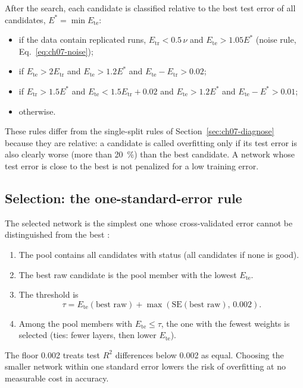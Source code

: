 After the search, each candidate is classified relative to the best test error of all candidates,
$E^* = \min E_\text{te}$:
\begin{itemize}
  \item {} if the data contain replicated runs, $E_\text{tr} < 0.5\,\nu$ and $E_\text{te} > 1.05
    E^*$ (noise rule, Eq.~\eqref{eq:ch07-noise});
  \item {} if $E_\text{te} > 2E_\text{tr}$ and $E_\text{te} > 1.2E^*$ and $E_\text{te} -
    E_\text{tr} > 0.02$;
  \item {} if $E_\text{tr} > 1.5E^*$ and $E_\text{te} < 1.5E_\text{tr} + 0.02$ and $E_\text{te} >
    1.2E^*$ and $E_\text{te} - E^* > 0.01$;
  \item {} otherwise.
\end{itemize}
These rules differ from the single-split rules of Section~\ref{sec:ch07-diagnose} because they are relative: a
candidate is called overfitting only if its test error is also clearly worse (more than 20~\%) than the best
candidate. A network whose test error is close to the best is not penalized for a low training error.

\subsection{Selection: the one-standard-error rule}

The selected network is the simplest one whose cross-validated error cannot be distinguished from the best
\citep{hastie2009}:
\begin{enumerate}
  \item The pool contains all candidates with status  (all candidates if none is good).
  \item The best raw candidate is the pool member with the lowest $E_\text{te}$.
  \item The threshold is
    \begin{equation}
      \tau = E_\text{te}(\text{best raw}) + \max\!\left(\text{SE}(\text{best raw}),\, 0.002\right).
      \label{eq:ch07-1se}
    \end{equation}
  \item Among the pool members with $E_\text{te} \le \tau$, the one with the fewest weights is selected (ties:
    fewer layers, then lower $E_\text{te}$).
\end{enumerate}
The floor 0.002 treats test $R^2$ differences below 0.002 as equal. Choosing the smaller network within one
standard error lowers the risk of overfitting at no measurable cost in accuracy.


